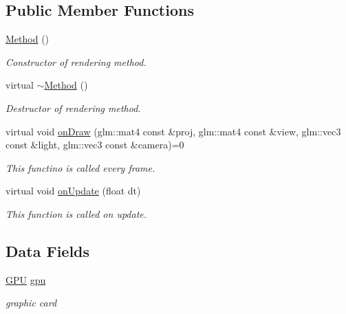 \subsection*{Public Member Functions}
\begin{DoxyCompactItemize}
\item 
\mbox{\label{classMethod_ab48717dc68d3c057b65574a539a480f7}} 
\hyperlink{classMethod_ab48717dc68d3c057b65574a539a480f7}{Method} ()
\begin{DoxyCompactList}\small\item\em Constructor of rendering method. \end{DoxyCompactList}\item 
\mbox{\label{classMethod_aa4e3f9623f9a67d2e3b3017fd8aa8264}} 
virtual \hyperlink{classMethod_aa4e3f9623f9a67d2e3b3017fd8aa8264}{$\sim$\+Method} ()
\begin{DoxyCompactList}\small\item\em Destructor of rendering method. \end{DoxyCompactList}\item 
virtual void \hyperlink{classMethod_ab07a971e2a1b04a658467c643423c347}{on\+Draw} (glm\+::mat4 const \&proj, glm\+::mat4 const \&view, glm\+::vec3 const \&light, glm\+::vec3 const \&camera)=0
\begin{DoxyCompactList}\small\item\em This functino is called every frame. \end{DoxyCompactList}\item 
virtual void \hyperlink{classMethod_a42dbfcfce68e920f7e957f737e93e698}{on\+Update} (float dt)
\begin{DoxyCompactList}\small\item\em This function is called on update. \end{DoxyCompactList}\end{DoxyCompactItemize}
\subsection*{Data Fields}
\begin{DoxyCompactItemize}
\item 
\mbox{\label{classMethod_a60dbb554906836cd162036be07ab1c87}} 
\hyperlink{classGPU}{G\+PU} \hyperlink{classMethod_a60dbb554906836cd162036be07ab1c87}{gpu}
\begin{DoxyCompactList}\small\item\em graphic card \end{DoxyCompactList}\end{DoxyCompactItemize}



